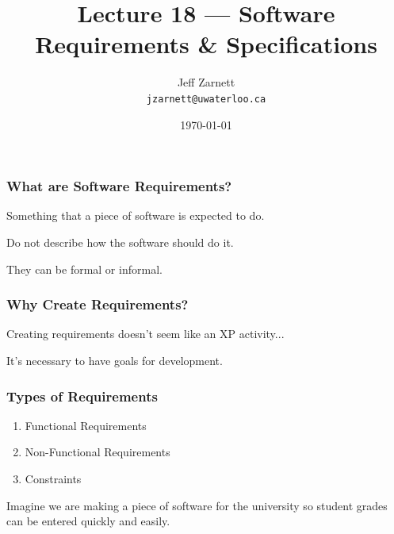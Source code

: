 

\title{Lecture 18 --- Software Requirements \& Specifications}

\author{Jeff Zarnett \\ \small \texttt{jzarnett@uwaterloo.ca}}
\date{\today}




\begin{frame}
  \titlepage
\end{frame}

\begin{frame}
\frametitle{What are Software Requirements?}

\begin{changemargin}{1cm}

Something that a piece of software is expected to do.

Do not describe how the software should do it.

They can be formal or informal.

\end{changemargin}
\end{frame}

\begin{frame}
\frametitle{Why Create Requirements?}

\begin{changemargin}{1cm}

Creating requirements doesn't seem like an XP activity...

It's necessary to have goals for development.

\end{changemargin}
\end{frame}


\begin{frame}
\frametitle{Types of Requirements}

\begin{changemargin}{1cm}

\begin{enumerate}
	\item Functional Requirements
	\item Non-Functional Requirements
	\item Constraints
\end{enumerate}

Imagine we are making a piece of software for the university so student grades can be entered quickly and easily.

\end{changemargin}
\end{frame}

